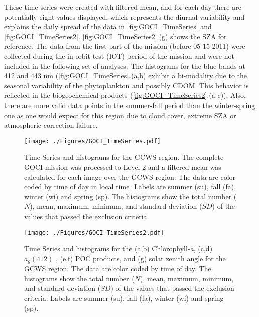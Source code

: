\documentclass[remotesensing,article,submit,moreauthors,pdftex,10pt,a4paper]{Definitions/mdpi}
\begin{document}
These time series were created with filtered mean, and for each day there are potentially eight values displayed, which represents the diurnal variability and explains the daily spread of the data in \autoref{fig:GOCI_TimeSeries} and \autoref{fig:GOCI_TimeSeries2}. \autoref{fig:GOCI_TimeSeries2}.(g) shows the SZA for reference. The data from the first part of the mission (before 05-15-2011) were collected during the in-orbit test (IOT) period of the mission and were not included in the following set of analyses. The histograms for the blue bands at 412 and 443 nm (\autoref{fig:GOCI_TimeSeries}.(a,b) exhibit a bi-modality due to the seasonal variability of the phytoplankton and possibly CDOM. This behavior is reflected in the biogeochemical products (\autoref{fig:GOCI_TimeSeries2}.(a-c)). Also, there are more valid data points in the summer-fall period than the winter-spring one as one would expect for this region due to cloud cover, extreme SZA or atmospheric correction failure.

\begin{figure}[htbp!]
  \centering
    \texttt{[image: ./Figures/GOCI\_TimeSeries.pdf]}
    \vspace{-0.5cm}
    \caption{Time Series and histograms for the GCWS region. The complete GOCI mission was processed to Level-2 and a filtered mean was calculated for each image over the GCWS region. The data are color coded by time of day in local time. Labels are summer (su), fall (fa), winter (wi) and spring (sp). The histograms show the total number ($N$), mean, maximum, minimum, and standard deviation ($SD$) of the values that passed the exclusion criteria. \label{fig:GOCI_TimeSeries} } 
\end{figure}
\begin{figure}[htbp!]

  \centering
    \texttt{[image: ./Figures/GOCI\_TimeSeries2.pdf]}
    \caption{Time Series and histograms for the (a,b) Chlorophyll-{\it a}, (c,d) $a_g(412)$ , (e,f) POC products, and (g) solar zenith angle for the GCWS region. The data are color coded by time of day. The histograms show the total number ($N$), mean, maximum, minimum, and standard deviation ($SD$) of the values that passed the exclusion criteria. Labels are summer (su), fall (fa), winter (wi) and spring (sp). \label{fig:GOCI_TimeSeries2} } 
\end{figure}
\end{document}
